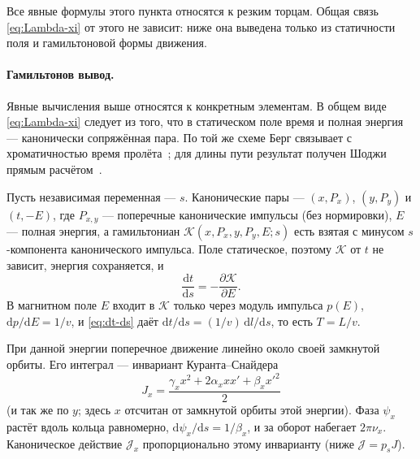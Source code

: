 Все явные формулы этого пункта относятся к резким торцам. Общая связь \eqref{eq:Lambda-xi} от этого не зависит: ниже она выведена только из статичности поля и гамильтоновой формы движения.

\paragraph{Гамильтонов вывод.}
Явные вычисления выше относятся к конкретным элементам. В общем виде \eqref{eq:Lambda-xi} следует из того, что в статическом поле время и полная энергия --- канонически сопряжённая пара. По той же схеме Берг связывает с хроматичностью время пролёта~\cite{Berg2007}; для длины пути результат получен Шоджи прямым расчётом~\cite{Shoji2005}.

Пусть независимая переменная --- $s$. Канонические пары --- $(x,P_x)$, $(y,P_y)$ и $(t,-E)$, где $P_{x,y}$ --- поперечные канонические импульсы (без нормировки), $E$ --- полная энергия, а гамильтониан $\mathcal{K}(x,P_x,y,P_y,E;s)$ есть взятая с минусом $s$-компонента канонического импульса. Поле статическое, поэтому $\mathcal{K}$ от $t$ не зависит, энергия сохраняется, и
\begin{equation}
\label{eq:dt-ds}
\frac{\mathrm{d}t}{\mathrm{d}s}=-\frac{\partial\mathcal{K}}{\partial E}.
\end{equation}
В магнитном поле $E$ входит в $\mathcal{K}$ только через модуль импульса $p(E)$,
$\mathrm{d}p/\mathrm{d}E=1/v$, и \eqref{eq:dt-ds} даёт
$\mathrm{d}t/\mathrm{d}s=(1/v)\,\mathrm{d}l/\mathrm{d}s$,
то есть $T=L/v$.

При данной энергии поперечное движение линейно около своей замкнутой орбиты. Его интеграл --- инвариант Куранта--Снайдера
\begin{equation*}
J_x=\frac{\gamma_x x^2+2\alpha_x xx'+\beta_x x'^2}{2}
\end{equation*}
(и так же по $y$; здесь $x$ отсчитан от замкнутой орбиты этой энергии). Фаза $\psi_x$ растёт вдоль кольца равномерно, $\mathrm{d}\psi_x/\mathrm{d}s=1/\beta_x$, и за оборот набегает $2\pi\nu_x$. Каноническое действие $\mathcal{J}_x$ пропорционально этому инварианту (ниже $\mathcal{J}=p_s J$).

